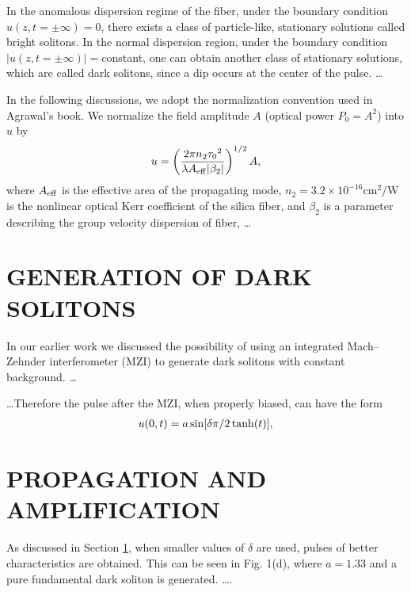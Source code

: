 In the anomalous dispersion regime of the fiber, under the boundary
condition $  u( z, t = \pm \infty ) = 0 $, there exists
a class of particle-like, stationary solutions
called bright solitons.\cite{HA}
In the normal dispersion region, under the boundary condition
$ | u( z, t = \pm \infty ) | = $constant,
one can obtain another class of stationary solutions,
which are called dark solitons, since a dip occurs at the
center of the pulse.\cite{HB} \ldots



In the following discussions, we adopt the normalization convention
used in Agrawal's book.\cite{AB}
We normalize the field amplitude $A$ (optical power $P_0 = A^2 $)
into $u$ by
\begin{eqnarray*}
u = \left( { 2 \pi n_2 {\tau_0}^2 }\over
{ \lambda A_{\rm eff} | \beta_2 | } \right)^{1/2} A ,
\end{eqnarray*}
where $A_{\rm eff }$ is the effective area of the propagating
mode, $n_2 = 3.2\times 10^{-16}$cm$^2 /$W is the nonlinear optical
Kerr coefficient of the silica
fiber, and $ \beta_{2} $ is a parameter describing
the group velocity dispersion of
fiber, \ldots




\section{GENERATION OF DARK SOLITONS}
\label{GDS}
In our earlier work\cite{ZBD,ZBE} we discussed the possibility
of using an integrated Mach--Zehnder interferometer
(MZI) to generate dark solitons with constant background. \ldots

 \ldots Therefore the pulse after the MZI,
when properly biased, can have the form
\begin{eqnarray}
u (0,t)  =  a\, {\rm sin} [ \delta \pi /2\, {\rm tanh} (t) ],
\label{E1}
\end{eqnarray}


\section{PROPAGATION AND AMPLIFICATION}
\label{PAA}
As discussed in Section \ref{GDS}, when smaller values of
$ \delta $ are used, pulses of better
characteristics are obtained.  This can be seen in Fig. 1(d),  where
$ a  =  1.33 $ and a pure fundamental dark soliton is
generated. \ldots .


